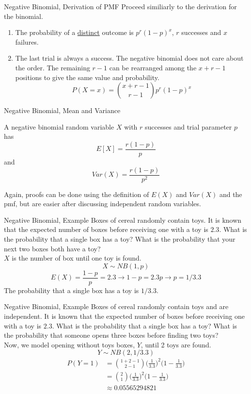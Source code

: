 \documentclass[handout]{beamer}
\newcommand{\nl}[1]{\vspace{#1 em}}
\begin{document}
        \begin{frame}{Negative Binomial, Derivation of PMF}
            Proceed similiarly to the derivation for the binomial.
            \begin{enumerate}{}
                \item The probability of a \underline{distinct} outcome is $p^r(1-p)^x$, $r$ successes and $x$ failures.
                \item The last trial is always a success. The negative binomial does not care about the order. The remaining $r-1$ can be rearranged among the $x+r-1$ positions to give the same value and probability.
                $$P(X=x) = \binom{x+r-1}{r-1}p^r(1-p)^x$$
            \end{enumerate}
        \end{frame}
        \begin{frame}{Negative Binomial, Mean and Variance}
            \begin{block}{}
                A negative binomial random variable $X$ with $r$ successes and trial parameter $p$ has 
                $$E[X] = \frac{r(1-p)}{p}$$
                and
                $$Var(X) = \frac{r(1-p)}{p^2}$$
            \end{block}
            Again, proofs can be done using the definition of $E(X)$ and $Var(X)$ and the pmf, but are easier after discussing independent random variables.
        \end{frame}
        \begin{frame}{Negative Binomial, Example}
            Boxes of cereal randomly contain toys. It is known that the expected number of boxes before receiving one with a toy is $2.3$. What is the probability that a single box has a toy? What is the probability that your next two boxes both have a toy?
            \\ \nl{0.5}
            \pause $X$ is the number of box until one toy is found.
            \pause $$X\sim NB(1,p)$$
            \pause $$E(X) =\frac{1-p}{p} = 2.3 \rightarrow 1-p = 2.3p \rightarrow p = 1/3.3 $$
            The probability that a single box has a toy is $1/3.3$.
        \end{frame}
        \begin{frame}{Negative Binomial, Example}
            Boxes of cereal randomly contain toys and are independent. It is known that the expected number of boxes before receiving one with a toy is $2.3$. What is the probability that a single box has a toy? What is the probability that someone opens three boxes before finding two toys?
            \\ \nl{0.5}
            Now, we model opening without toys boxes, $Y$, until 2 toys are found.
            \pause $$Y\sim NB(2,1/3.3)$$
            \pause \begin{align*}
                P(Y = 1) &= \binom{1+2-1}{2-1} \bigg(\frac{1}{3.3}\bigg)^2\bigg(1- \frac{1}{3.3}\bigg) \\
                &= \binom{2}{1} \bigg(\frac{1}{3.3}\bigg)^2\bigg(1- \frac{1}{3.3}\bigg) \\
                & \approx 0.05565294821 \\
            \end{align*}
        \end{frame}
\end{document}
